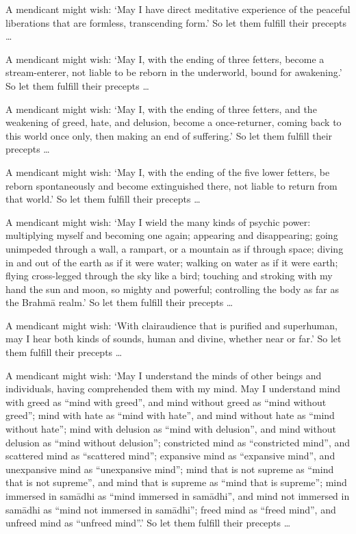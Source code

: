 \documentclass[12pt,openany]{book}%
\begin{document}
A mendicant might wish: ‘May I have direct meditative experience of the peaceful liberations that are formless, transcending form.’ So let them fulfill their precepts … 

A mendicant might wish: ‘May I, with the ending of three fetters, become a stream-enterer, not liable to be reborn in the underworld, bound for awakening.’ So let them fulfill their precepts … 

A mendicant might wish: ‘May I, with the ending of three fetters, and the weakening of greed, hate, and delusion, become a once-returner, coming back to this world once only, then making an end of suffering.’ So let them fulfill their precepts … 

A mendicant might wish: ‘May I, with the ending of the five lower fetters, be reborn spontaneously and become extinguished there, not liable to return from that world.’ So let them fulfill their precepts … 

A mendicant might wish: ‘May I wield the many kinds of psychic power: multiplying myself and becoming one again; appearing and disappearing; going unimpeded through a wall, a rampart, or a mountain as if through space; diving in and out of the earth as if it were water; walking on water as if it were earth; flying cross-legged through the sky like a bird; touching and stroking with my hand the sun and moon, so mighty and powerful; controlling the body as far as the \textsanskrit{Brahmā} realm.’ So let them fulfill their precepts … 

A mendicant might wish: ‘With clairaudience that is purified and superhuman, may I hear both kinds of sounds, human and divine, whether near or far.’ So let them fulfill their precepts … 

A mendicant might wish: ‘May I understand the minds of other beings and individuals, having comprehended them with my mind. May I understand mind with greed as “mind with greed”, and mind without greed as “mind without greed”; mind with hate as “mind with hate”, and mind without hate as “mind without hate”; mind with delusion as “mind with delusion”, and mind without delusion as “mind without delusion”; constricted mind as “constricted mind”, and scattered mind as “scattered mind”; expansive mind as “expansive mind”, and unexpansive mind as “unexpansive mind”; mind that is not supreme as “mind that is not supreme”, and mind that is supreme as “mind that is supreme”; mind immersed in \textsanskrit{samādhi} as “mind immersed in \textsanskrit{samādhi}”, and mind not immersed in \textsanskrit{samādhi} as “mind not immersed in \textsanskrit{samādhi}”; freed mind as “freed mind”, and unfreed mind as “unfreed mind”.’ So let them fulfill their precepts … 
\end{document}
